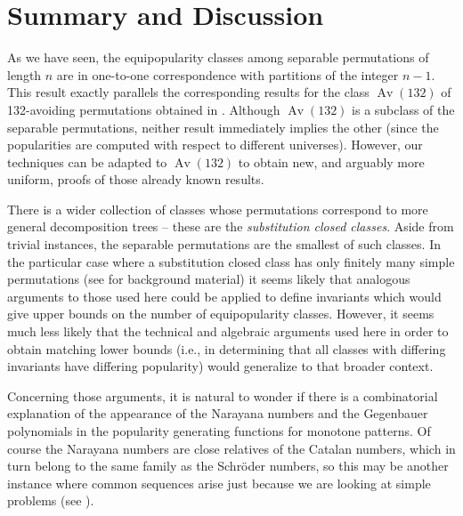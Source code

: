 \documentclass[10pt]{article}
\theoremstyle{definition}
\numberwithin{equation}{section}
\numberwithin{figure}{section}
\begin{document}
\section{Summary and Discussion}

As we have seen, the equipopularity classes among separable permutations of length $n$ are in one-to-one correspondence with partitions of the integer $n-1$. This result exactly parallels the corresponding results for the class $\operatorname{Av}(132)$ of 132-avoiding permutations obtained in \cite{chua:popularity, rudolph:popularity}. Although $\operatorname{Av}(132)$ is a subclass of the separable permutations, neither result immediately implies the other (since the popularities are computed with respect to different universes). However, our techniques can be adapted to $\operatorname{Av}(132)$ to obtain new, and arguably more uniform, proofs of those already known results.

There is a wider collection of classes whose permutations correspond to more general decomposition trees -- these are the \emph{substitution closed classes}. Aside from trivial instances, the separable permutations are the smallest of such classes. In the particular case where a substitution closed class has only finitely many simple permutations (see \cite{albert:simple-permutat:} for background material) it seems likely that analogous arguments to those used here could be applied to define invariants which would give upper bounds on the number of equipopularity classes. However, it seems much less likely that the technical and algebraic arguments used here in order to obtain matching lower bounds (i.e., in determining that all classes with differing invariants have differing popularity) would generalize to that broader context.

Concerning those arguments, it is natural to wonder if there is a combinatorial explanation of the appearance of the Narayana numbers and the Gegenbauer polynomials in the popularity generating functions for monotone patterns. Of course the Narayana numbers are close relatives of the Catalan numbers, which in turn belong to the same family as the Schr\"{o}der numbers, so this may be another instance where common sequences arise just because we are looking at simple problems (see \cite{zeilberger:opinion49}).
  
\end{document}
